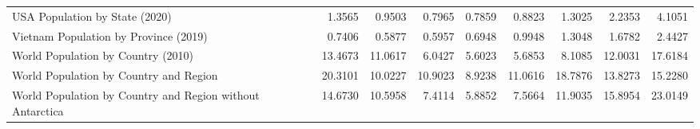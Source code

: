 \begin{tabular}{lrrrrrrrr}
                           USA Population by State (2020) &   1.3565 &  0.9503 &  0.7965 &  0.7859 &  0.8823 &  1.3025 &  2.2353 &   4.1051 \\
                    Vietnam Population by Province (2019) &   0.7406 &  0.5877 &  0.5957 &  0.6948 &  0.9948 &  1.3048 &  1.6782 &   2.4427 \\
                       World Population by Country (2010) &  13.4673 & 11.0617 &  6.0427 &  5.6023 &  5.6853 &  8.1085 & 12.0031 &  17.6184 \\
                   World Population by Country and Region &  20.3101 & 10.0227 & 10.9023 &  8.9238 & 11.0616 & 18.7876 & 13.8273 &  15.2280 \\
World Population by Country and Region without Antarctica &  14.6730 & 10.5958 &  7.4114 &  5.8852 &  7.5664 & 11.9035 & 15.8954 &  23.0149 \\
\bottomrule
\end{tabular}
